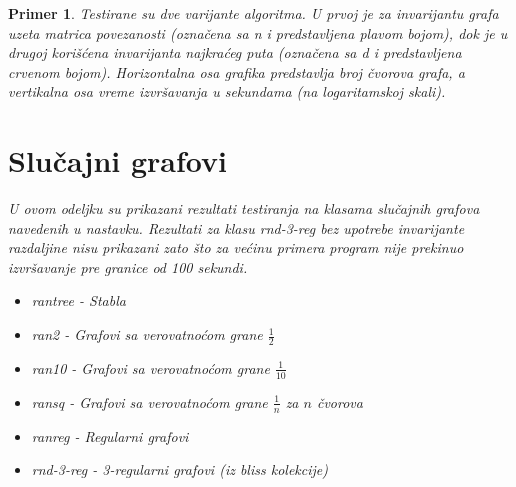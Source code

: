 \documentclass[12pt,oneside]{memoir}
\newtheorem{example}{Primer}
\theoremstyle{definition}
\begin{document}
\begin{example}
	Testirane su dve varijante algoritma. U prvoj je za invarijantu grafa uzeta
	matrica povezanosti (označena sa \emph{n} i predstavljena plavom bojom),
	dok je u drugoj korišćena invarijanta najkraćeg puta (označena sa \emph{d}
	i predstavljena crvenom bojom). Horizontalna osa grafika predstavlja broj
	čvorova grafa, a vertikalna osa vreme izvršavanja u sekundama (na
	logaritamskoj skali).

	\pagebreak

  \section{Slučajni grafovi}

	U ovom odeljku su prikazani rezultati testiranja na klasama slučajnih
	grafova navedenih u nastavku. Rezultati za klasu \emph{rnd-3-reg} bez
	upotrebe invarijante razdaljine nisu prikazani zato što za većinu primera
	program nije prekinuo izvršavanje pre granice od 100 sekundi.
	\begin{itemize}
		\item \emph{rantree} - Stabla
		\item \emph{ran2} - Grafovi sa verovatnoćom grane $\frac{1}{2}$
		\item \emph{ran10} - Grafovi sa verovatnoćom grane $\frac{1}{10}$
		\item \emph{ransq} - Grafovi sa verovatnoćom grane $\frac{1}{n}$ za $n$ čvorova
		\item \emph{ranreg} - Regularni grafovi
		\item \emph{rnd-3-reg} - 3-regularni grafovi (iz \emph{bliss} kolekcije)
	\end{itemize}
	


\end{example}
\end{document}

